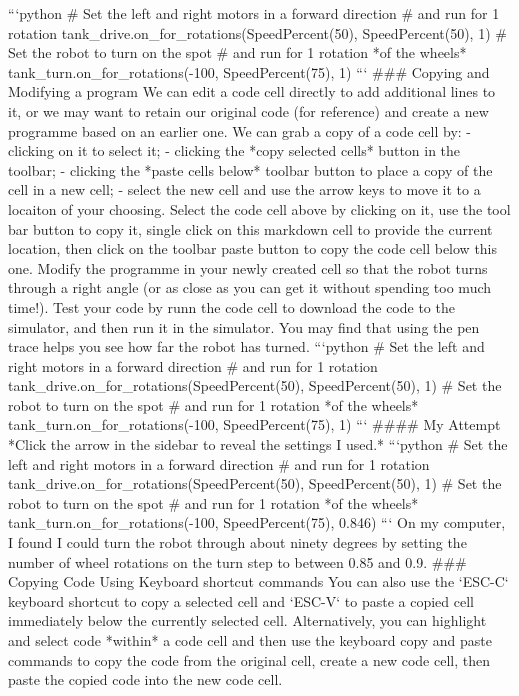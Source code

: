 \documentclass[letterpaper,10pt,english]{sphinxmanual}
\begin{document}
{```python
# Set the left and right motors in a forward direction
# and run for 1 rotation
tank_drive.on_for_rotations(SpeedPercent(50), SpeedPercent(50), 1)
# Set the robot to turn on the spot
# and run for 1 rotation *of the wheels*
tank_turn.on_for_rotations(-100, SpeedPercent(75), 1)
```
### Copying and Modifying a program
We can edit a code cell directly to add additional lines to it, or we may want to retain our original code (for reference) and create a new programme based on an earlier one.
We can grab a copy of a code cell by:
- clicking on it to select it;
- clicking the *copy selected cells* button in the toolbar;
- clicking the *paste cells below* toolbar button to place a copy of the cell in a new cell;
- select the new cell and use the arrow keys to move it to a locaiton of your choosing.
Select the code cell above by clicking on it, use the tool bar button to copy it, single click on this markdown cell to provide the current location, then click on the toolbar paste button to copy the code cell below this one.
Modify the programme in your newly created cell so that the robot turns through a right angle (or as close as you can get it without spending too much time!). Test your code by runn the code cell to download the code to the simulator, and then run it in the simulator.
You may find that using the pen trace helps you see how far the robot has turned.
```python
# Set the left and right motors in a forward direction
# and run for 1 rotation
tank_drive.on_for_rotations(SpeedPercent(50), SpeedPercent(50), 1)
# Set the robot to turn on the spot
# and run for 1 rotation *of the wheels*
tank_turn.on_for_rotations(-100, SpeedPercent(75), 1)
```
#### My Attempt
*Click the arrow in the sidebar to reveal the settings I used.*
```python
# Set the left and right motors in a forward direction
# and run for 1 rotation
tank_drive.on_for_rotations(SpeedPercent(50), SpeedPercent(50), 1)
# Set the robot to turn on the spot
# and run for 1 rotation *of the wheels*
tank_turn.on_for_rotations(-100, SpeedPercent(75), 0.846)
```
On my computer, I found I could turn the robot through about ninety degrees by setting the number of wheel rotations on the turn step to between 0.85 and 0.9.
### Copying Code Using Keyboard shortcut commands
You can also use the `ESC-C` keyboard shortcut to copy a selected cell and `ESC-V` to paste a copied cell immediately below the currently selected cell.
Alternatively, you can highlight and select code *within* a code cell and then use the keyboard copy and paste commands to copy the code from the original cell, create a new code cell, then paste the copied code into the new code cell.
}
\end{document}
